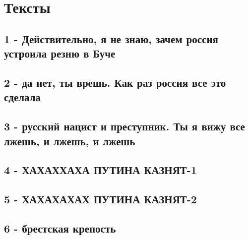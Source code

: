  
 
 
 
 


\section{Тексты}


\subsection{1 - Действительно, я не знаю, зачем россия устроила резню в Буче}

\subsection{2 - да нет, ты врешь. Как раз россия все это сделала}

\subsection{3 - русский нацист и преступник. Ты я вижу все лжешь, и лжешь, и лжешь}

\subsection{4 - ХАХАХХАХА ПУТИНА КАЗНЯТ-1}

\subsection{5 - ХАХАХАХАХ ПУТИНА КАЗНЯТ-2}

\subsection{6 - брестская крепость}

